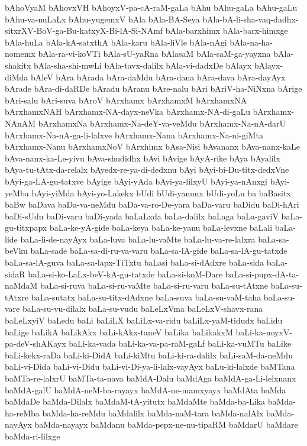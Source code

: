 {bAhoVyaM
bAhovxVH
bAhoyxV-pa-cA-raM-gaLa
bAhu
bAhu-gaLa
bAhu-gaLu
bAhu-va-nuLaLx
bAhu-yugemxV
bAla
bAla-BA-Seya
bAla-bA-li-sha-vaq-dadhx-sitxrXV-BoV-ga-Bu-katxyX-Bi-lA-Si-NAmf
bAla-barxhimx
bAla-barx-himxge
bAla-huLa
bAla-kA-satxthA
bAla-karu
bAla-liVle
bAla-nAgi
bAla-na-ha-nomemx
bAla-ra-vi-koVTi
bAla-sU-yaRna
bAlasaM
bAla-saM-ga-yayxna
bAla-shakitx
bAla-sha-shi-mwLi
bAla-tavx-dalilx
bAla-vi-dadxDe
bAlayx
bAlayx-diMda
bAleV
bAra
bArada
bAra-daMdu
bAra-dana
bAra-dava
bAra-dayAyx
bArade
bAra-di-daRDe
bAradu
bAranu
bAre-nalu
bAri
bAriV-ha-NiNxna
bArige
bAri-salu
bAri-suva
bAroV
bArxhamx
bArxhamxM
bArxhamxNA
bArxhamxNAH
bArxhamx-NA-dayx-neVka
bArxhamx-NA-di-gaLu
bArxhamx-NAnAM
bArxhamxNa
bArxhamx-Na-deY-va-veMdu
bArxhamx-Na-nA-darU
bArxhamx-Na-nA-ga-li-lalxve
bArxhamx-Nana
bArxhamx-Na-ni-giMta
bArxhamx-Nanu
bArxhamxNoV
bArxhimx
bAsa-Nisi
bAvananx
bAva-nanx-kaLe
bAva-nanx-ka-Le-yivu
bAva-shudidhx
bAvi
bAvige
bAyA-rike
bAya
bAyalilx
bAya-tu-tAtx-da-relalx
bAyedx-re-ya-di-dedxnu
bAyi
bAyi-bi-Du-titx-dedxVne
bAyi-ga-LA-gu-tatxve
bAyige
bAyi-yAda
bAyi-ya-lilxyU
bAyi-ya-nAnxgi
bAyi-yeMba
bAyi-yiMda
bAyi-yo-Lakekx
bUdi
bUdi-yanunx
bUdi-yoLu
ba
baBasitx
baBw
baDava
baDa-va-neMdu
baDa-va-ro-De-yara
baDa-varu
baDidu
baDi-hAri
baDi-sUdu
baDi-varu
baDi-yada
baLaLxda
baLa-dalilx
baLaga
baLa-gaviV
baLa-gu-titxpapx
baLa-ke-yA-gide
baLa-keya
baLa-ke-yanu
baLa-levxne
baLali
baLa-lide
baLa-li-de-nayAyx
baLa-luva
baLa-lu-vaMte
baLa-lu-va-re-lalxra
baLa-sa-beVku
baLa-sade
baLa-sa-di-ru-va-varu
baLa-sa-lA-gide
baLa-sa-lA-gu-tatxde
baLa-sa-lA-guva
baLa-sa-lapx-TiTxtu
baLasi
baLa-si-dAdxre
baLa-sida
baLa-sidaR
baLa-si-ko-LaLx-beV-kA-gu-tatxde
baLa-si-koM-Dare
baLa-si-pupx-dA-ta-naMdaM
baLa-si-ruva
baLa-si-ru-vaMte
baLa-si-ru-varu
baLa-su-tAtxne
baLa-su-tAtxre
baLa-sutatx
baLa-su-titx-dAdxne
baLa-suva
baLa-su-vaM-taha
baLa-su-vare
baLa-su-vu-dilalx
baLa-su-vudu
baLeLxVma
baLeLxV-shavx-rana
baLeLxyiV
baLedu
baLi
baLiLX
baLiLx-va-ridu
baLiLx-yaM-tidudx
baLidu
baLige
baLikA
baLikAkx
baLi-kAkx-taneV
baLika
baLikakxM
baLi-ka-noyxV-pa-deV-shAKayx
baLi-ka-vada
baLi-ka-va-pa-raM-gaLf
baLi-ka-vuMTu
baLike
baLi-kekx-raDa
baLi-ki-DidA
baLi-kiMtu
baLi-ki-ra-dalilx
baLi-saM-da-neMdu
baLi-vi-Dida
baLi-vi-Didu
baLi-vi-Di-ya-li-lalx-vayAyx
baLu-ki-lalxde
baMTana
baMTa-re-lalxrU
baMTa-ta-nava
baMdA-Dalu
baMdAga
baMdA-ga-Li-lelxnanx
baMdA-galU
baMdA-neM-ba-rayayx
baMdA-ne-mamxyayx
baMdAta
baMda
baMdaDe
baMda-Dilalx
baMdaM-tA-yitutx
baMdaMte
baMda-ba-Lika
baMda-ha-reMba
baMda-ha-reMdu
baMdalilx
baMda-naM-tara
baMda-nalAlx
baMda-nayAyx
baMda-nayayx
baMdanu
baMda-pepx-ne-nu-tipaRM
baMdarU
baMdare
baMda-ri-lilxge
}
